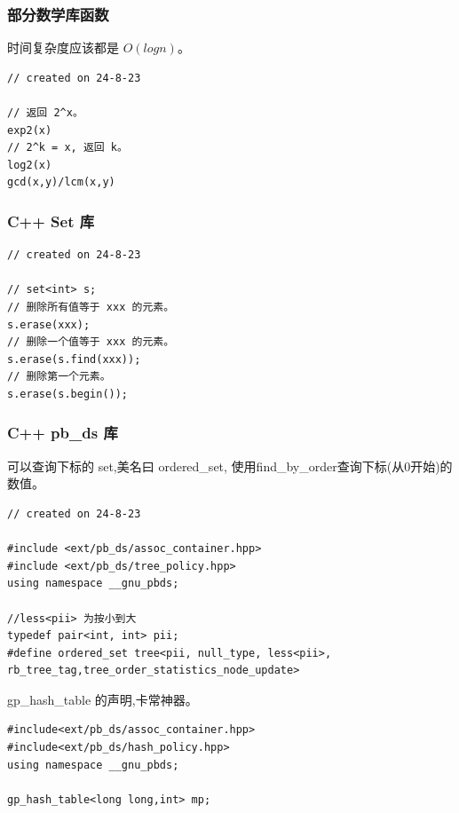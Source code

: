 \documentclass[a4paper,12pt]{article}
\begin{document}
\subsubsection{部分数学库函数}
\noindent 时间复杂度应该都是 $O(logn)$。
\begin{lstlisting}
// created on 24-8-23

// 返回 2^x。
exp2(x) 
// 2^k = x, 返回 k。
log2(x) 
gcd(x,y)/lcm(x,y)
\end{lstlisting}

\subsubsection{C++ Set 库}
\begin{lstlisting}
// created on 24-8-23

// set<int> s;
// 删除所有值等于 xxx 的元素。
s.erase(xxx);
// 删除一个值等于 xxx 的元素。
s.erase(s.find(xxx));
// 删除第一个元素。
s.erase(s.begin());
\end{lstlisting}

\subsubsection{C++ pb\_ds 库}
\noindent 可以查询下标的 set,美名曰 ordered\_set,
使用find\_by\_order查询下标(从0开始)的数值。

\begin{lstlisting}
// created on 24-8-23

#include <ext/pb_ds/assoc_container.hpp>
#include <ext/pb_ds/tree_policy.hpp>
using namespace __gnu_pbds;

//less<pii> 为按小到大
typedef pair<int, int> pii;
#define ordered_set tree<pii, null_type, less<pii>,
rb_tree_tag,tree_order_statistics_node_update>
\end{lstlisting}

\noindent gp\_hash\_table 的声明,卡常神器。

\begin{lstlisting}
#include<ext/pb_ds/assoc_container.hpp>
#include<ext/pb_ds/hash_policy.hpp>
using namespace __gnu_pbds;

gp_hash_table<long long,int> mp;
\end{lstlisting}
\end{document}
